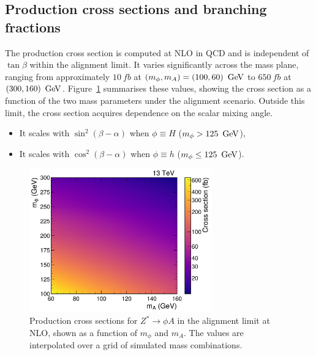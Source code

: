 \subsection{Production cross sections and branching fractions}
\label{Section:Chapter6_production_xs_bf}
The production cross section is computed at NLO in QCD and is independent of $\tan\beta$ within the alignment limit. It varies significantly across the mass plane, ranging from approximately $10~\unit{fb}$ at $(m_\phi, m_A) = (100, 60)~\,\text{Ge\hspace{-.08em}V}$ to $650~\unit{fb}$ at $(300, 160)~\,\text{Ge\hspace{-.08em}V}$. Figure~\ref{Figure:Chapter6_ProductionXS} summarises these values, showing the cross section as a function of the two mass parameters under the alignment scenario. Outside this limit, the cross section acquires dependence on the scalar mixing angle.

\begin{itemize}
    \item It scales with $\sin^2(\beta - \alpha)$ when $\phi \equiv H$ ($m_\phi > 125~\,\text{Ge\hspace{-.08em}V}$),
    \item It scales with $\cos^2(\beta - \alpha)$ when $\phi \equiv h$ ($m_\phi \leq 125~\,\text{Ge\hspace{-.08em}V}$).
\end{itemize}

\begin{figure}[!htbp]
  \centering
  \includegraphics[width=0.7\textwidth]{Figures/Chapter6/Production_XS.pdf}
    \caption[Production cross sections for $Z^* \to \phi A$ in the alignment limit.]{Production cross sections for $Z^* \to \phi A$ in the alignment limit at NLO, shown as a function of $m_\phi$ and $m_A$. The values are interpolated over a grid of simulated mass combinations.}
  \label{Figure:Chapter6_ProductionXS}
\end{figure}

